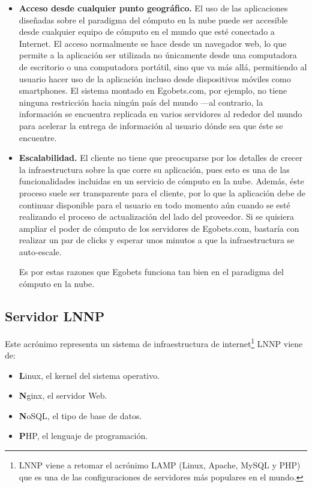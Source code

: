 \begin{itemize}
	\item \textbf{Acceso desde cualquier punto geográfico.} El uso de las aplicaciones diseñadas sobre el paradigma del cómputo en la nube puede ser accesible desde cualquier equipo de cómputo en el mundo que esté conectado a Internet. El acceso normalmente se hace desde un navegador web, lo que permite a la aplicación ser utilizada no únicamente desde una computadora de escritorio o una computadora portátil, sino que va más allá, permitiendo al usuario hacer uso de la aplicación incluso desde dispositivos móviles como smartphones. El sistema montado en Egobets.com, por ejemplo, no tiene ninguna restricción hacia ningún país del mundo —al contrario, la información se encuentra replicada en varios servidores al rededor del mundo para acelerar la entrega de información al usuario dónde sea que éste se encuentre.

	\item \textbf{Escalabilidad.} El cliente no tiene que preocuparse por los detalles de crecer la infraestructura sobre la que corre su aplicación, pues esto es una de las funcionalidades incluidas en un servicio de cómputo en la nube. Además, éste proceso suele ser transparente para el cliente, por lo que la aplicación debe de continuar disponible para el usuario en todo momento aún cuando se esté realizando el proceso de actualización del lado del proveedor. Si se quisiera ampliar el poder de cómputo de los servidores de Egobets.com, bastaría con realizar un par de clicks y esperar unos minutos a que la infraestructura se auto-escale.

Es por estas razones que Egobets funciona tan bien en el paradigma del cómputo en la nube.

\end{itemize}

\subsection{Servidor LNNP}

Este acrónimo representa un sistema de infraestructura de internet\footnote{LNNP viene a retomar el acrónimo LAMP (Linux, Apache, MySQL y PHP) que es una de las configuraciones de servidores más populares en el mundo.} LNNP viene de:
\begin{itemize}
	\item \textbf{L}inux, el kernel del sistema operativo.
	\item \textbf{N}ginx, el servidor Web.
	\item \textbf{N}oSQL, el tipo de base de datos.
	\item \textbf{P}HP, el lenguaje de programación.
\end{itemize}

